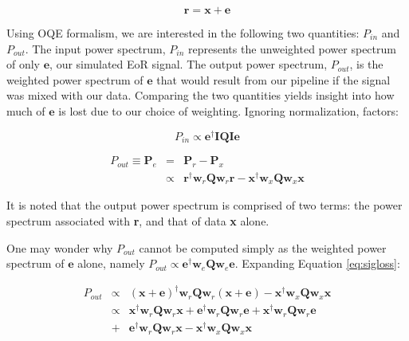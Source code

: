 \documentclass[preprint2,numberedappendix,tighten,twocolappendix]{aastex6}  %
\begin{document}
\begin{equation}
\textbf{r} = \textbf{x} + \textbf{e}
\end{equation}

Using OQE formalism, we are interested in the following two quantities: $P_{in}$ and $P_{out}$. The input power spectrum, $P_{in}$ represents the unweighted power spectrum of only $\textbf{e}$, our simulated EoR signal. The output power spectrum, $P_{out}$, is the weighted power spectrum of $\textbf{e}$ that would result from our pipeline if the signal was mixed with our data. Comparing the two quantities yields insight into how much of $\textbf{e}$ is lost due to our choice of weighting. Ignoring normalization, factors:

\begin{equation}
P_{in} \propto \textbf{e}^{\dagger}\textbf{I}\textbf{Q}\textbf{I}\textbf{e}
\end{equation}

\begin{eqnarray}
\label{eq:sigloss}
P_{out} \equiv \textbf{P}_{e} &=& \textbf{P}_{r}-\textbf{P}_{x} \nonumber \\
&\propto& \textbf{r}^{\dagger}\textbf{w}_{r}\textbf{Q}\textbf{w}_{r}\textbf{r} - \textbf{x}^{\dagger}\textbf{w}_{x}\textbf{Q}\textbf{w}_{x}\textbf{x} 
\end{eqnarray}

It is noted that the output power spectrum is comprised of two terms: the power spectrum associated with \textbf{r}, and that of data \textbf{x} alone. 

One may wonder why $P_{out}$ cannot be computed simply as the weighted power spectrum of $\textbf{e}$ alone, namely $P_{out} \propto \textbf{e}^{\dagger}\textbf{w}_{e}\textbf{Q}\textbf{w}_{e}\textbf{e}$. Expanding Equation \ref{eq:sigloss}:

\begin{eqnarray}
P_{out} &\propto& (\textbf{x}+\textbf{e})^{\dagger}\textbf{w}_{r}\textbf{Q}\textbf{w}_{r}(\textbf{x}+\textbf{e}) - \textbf{x}^{\dagger}\textbf{w}_{x}\textbf{Q}\textbf{w}_{x}\textbf{x} \nonumber \\
&\propto& \textbf{x}^{\dagger}\textbf{w}_{r}\textbf{Q}\textbf{w}_{r}\textbf{x} + \textbf{e}^{\dagger}\textbf{w}_{r}\textbf{Q}\textbf{w}_{r}\textbf{e} + \textbf{x}^{\dagger}\textbf{w}_{r}\textbf{Q}\textbf{w}_{r}\textbf{e} \nonumber \\
&+& \textbf{e}^{\dagger}\textbf{w}_{r}\textbf{Q}\textbf{w}_{r}\textbf{x} - \textbf{x}^{\dagger}\textbf{w}_{x}\textbf{Q}\textbf{w}_{x}\textbf{x} \nonumber 
\end{eqnarray}
\end{document}
